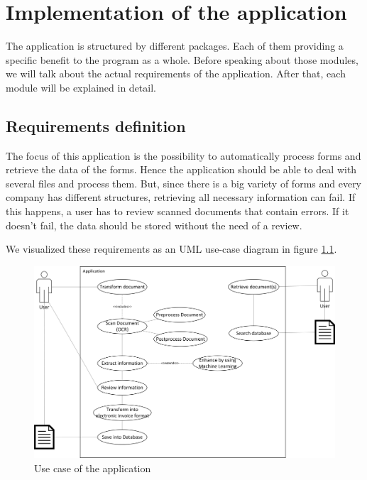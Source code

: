 %
% 
\chapter{Implementation of the application}
\label{cha5}

The application is structured by different packages. Each of them providing a specific benefit to the program as a whole. Before speaking about those modules, we will talk about the actual requirements of the application. After that, each module will be explained in detail.

\section{Requirements definition}
\label{sec5.1}

The focus of this application is the possibility to automatically process forms and retrieve the data of the forms. Hence the application should be able to deal with several files and process them. But, since there is a big variety of forms and every company has different structures, retrieving all necessary information can fail. If this happens, a user has to review scanned documents that contain errors. If it doesn't fail, the data should be stored without the need of a review.

We visualized these requirements as an UML use-case diagram in figure \ref{totalApplicationCase}.

\begin{figure}[ht!]
\centering
\includegraphics[width=\textwidth]{Images/UseCase/TotalApplicationCase.jpg}
\caption{Use case of the application \label{totalApplicationCase}}
\end{figure}

